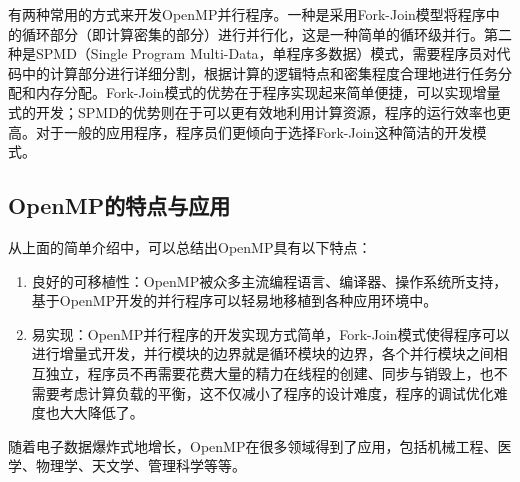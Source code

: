 有两种常用的方式来开发OpenMP并行程序。一种是采用Fork-Join模型将程序中的循环部分（即计算密集的部分）进行并行化，这是一种简单的循环级并行。第二种是SPMD（Single Program Multi-Data，单程序多数据）模式，需要程序员对代码中的计算部分进行详细分割，根据计算的逻辑特点和密集程度合理地进行任务分配和内存分配。Fork-Join模式的优势在于程序实现起来简单便捷，可以实现增量式的开发；SPMD的优势则在于可以更有效地利用计算资源，程序的运行效率也更高。对于一般的应用程序，程序员们更倾向于选择Fork-Join这种简洁的开发模式。

\subsection{OpenMP的特点与应用}
从上面的简单介绍中，可以总结出OpenMP具有以下特点：
\begin{enumerate}
\item	良好的可移植性：OpenMP被众多主流编程语言、编译器、操作系统所支持，基于OpenMP开发的并行程序可以轻易地移植到各种应用环境中。
\item	易实现：OpenMP并行程序的开发实现方式简单，Fork-Join模式使得程序可以进行增量式开发，并行模块的边界就是循环模块的边界，各个并行模块之间相互独立，程序员不再需要花费大量的精力在线程的创建、同步与销毁上，也不需要考虑计算负载的平衡，这不仅减小了程序的设计难度，程序的调试优化难度也大大降低了。
\end{enumerate}
随着电子数据爆炸式地增长，OpenMP在很多领域得到了应用，包括机械工程、医学、物理学、天文学、管理科学等等。

